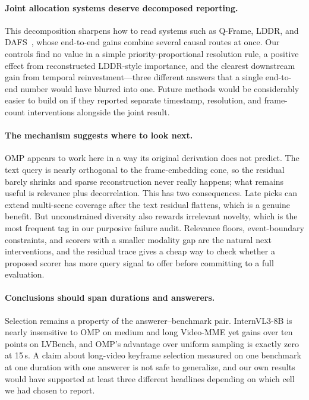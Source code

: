 \documentclass[11pt]{article}
\begin{document}
\paragraph{Joint allocation systems deserve decomposed reporting.}
This decomposition sharpens how to read systems such as Q-Frame, LDDR, and DAFS~\citep{zhang2025qframe,chen2026lddr,wang2026dafs}, whose end-to-end gains combine several causal routes at once.
Our controls find no value in a simple priority-proportional resolution rule, a positive effect from reconstructed LDDR-style importance, and the clearest downstream gain from temporal reinvestment---three different answers that a single end-to-end number would have blurred into one.
Future methods would be considerably easier to build on if they reported separate timestamp, resolution, and frame-count interventions alongside the joint result.

\paragraph{The mechanism suggests where to look next.}
OMP appears to work here in a way its original derivation does not predict.
The text query is nearly orthogonal to the frame-embedding cone, so the residual barely shrinks and sparse reconstruction never really happens; what remains useful is relevance plus decorrelation.
This has two consequences.
Late picks can extend multi-scene coverage after the text residual flattens, which is a genuine benefit.
But unconstrained diversity also rewards irrelevant novelty, which is the most frequent tag in our purposive failure audit.
Relevance floors, event-boundary constraints, and scorers with a smaller modality gap are the natural next interventions, and the residual trace gives a cheap way to check whether a proposed scorer has more query signal to offer before committing to a full evaluation.

\paragraph{Conclusions should span durations and answerers.}
Selection remains a property of the answerer--benchmark pair.
InternVL3-8B is nearly insensitive to OMP on medium and long Video-MME yet gains over ten points on LVBench, and OMP's advantage over uniform sampling is exactly zero at 15\,s.
A claim about long-video keyframe selection measured on one benchmark at one duration with one answerer is not safe to generalize, and our own results would have supported at least three different headlines depending on which cell we had chosen to report.
\end{document}

